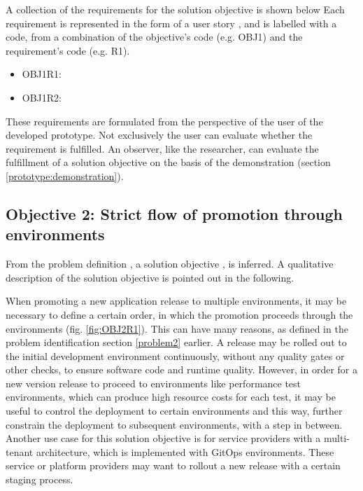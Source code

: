 A collection of the requirements for the solution objective is shown below
Each requirement is represented in the form of a user story
\autocite{userStoriesCohn2004user},
and is labelled with a code, from a combination of the
objective's code (e.g. OBJ1) and the requirement's code (e.g. R1).

\begin{itemize}
	\item OBJ1R1: 
	\item OBJ1R2: 
\end{itemize}

These requirements are formulated from the perspective of the user of the developed prototype.
Not exclusively the user can evaluate whether the requirement is fulfilled.
An observer, like the researcher, can evaluate the fulfillment of a solution objective
on the basis of the demonstration (section \ref{prototype:demonstration}).

\subsection{Objective 2: Strict flow of promotion through environments}
\label{objective2}

From the problem definition
\textit{},
a solution objective
\textit{},
is inferred.
A qualitative description of the solution objective
is pointed out in the following.

When promoting a new application release to multiple environments,
it may be necessary to define a certain order, in which the promotion proceeds
through the environments (fig. \ref{fig:OBJ2R1}).
This can have many reasons,
as defined in the problem identification section \ref{problem2} earlier.
A release may be rolled out to the initial development environment continuously,
without any quality gates or other checks, to ensure software code and runtime quality.
However, in order for a new version release to proceed to environments like
performance test environments, which can produce high resource costs for each test,
it may be useful to control the deployment to certain environments and this way, further constrain
the deployment to subsequent environments, with a step in between.
Another use case for this solution objective is for service providers
with a multi-tenant architecture, which is implemented with GitOps environments.
These service or platform providers may want to rollout a new release with a certain staging process.

